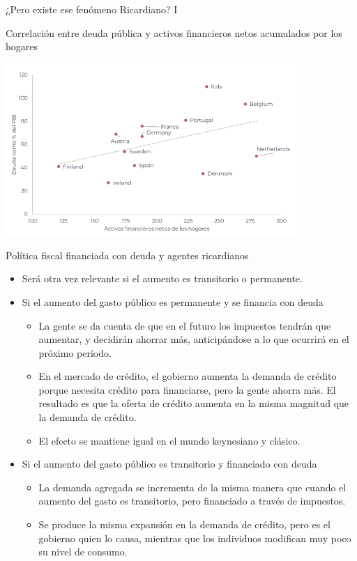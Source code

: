 \documentclass{beamer}
\begin{document}
\begin{frame}{¿Pero existe ese fenómeno Ricardiano? I}

    \begin{center}
        Correlación entre deuda pública y activos financieros netos acumulados por los hogares
    \end{center}

    \centering\includegraphics[width=11cm]{../Figures/C41.6.png}\  
\end{frame}

    
\begin{frame}{Política fiscal financiada con deuda y agentes ricardianos}
    
    \begin{itemize}
        \item Será otra vez relevante si el aumento es transitorio o permanente.
        \item Si el aumento del gasto público es permanente y se financia con deuda
        \begin{itemize}
            \item La gente se da cuenta de que en el futuro los impuestos tendrán que
            aumentar, y decidirán ahorrar más, anticipándose a lo que ocurrirá en
            el próximo período.
            \item En el mercado de crédito, el gobierno aumenta la
            demanda de crédito porque necesita crédito para financiarse, pero la
            gente ahorra más. El resultado es que la oferta de crédito aumenta en
            la misma magnitud que la demanda de crédito.
            \item El efecto se mantiene igual en el mundo keynesiano y clásico.
        \end{itemize}
        \item Si el aumento del gasto público es transitorio y financiado con deuda
        \begin{itemize}
            \item La demanda agregada se incrementa de la misma manera que cuando el aumento del gasto es transitorio, pero
            financiado a través de impuestos.
            \item Se produce la misma expansión en la demanda de crédito, pero es
            el gobierno quien lo causa, mientras que los individuos modifican muy
            poco su nivel de consumo.
        \end{itemize}
    \end{itemize}

\end{frame}
\end{document}
